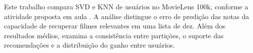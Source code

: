 Este trabalho compara SVD e KNN de usuários no MovieLens 100k, conforme a
atividade proposta em aula \cite{aula}. A análise distingue o erro de predição
das notas da capacidade de recuperar filmes relevantes em uma lista de dez.
Além dos resultados médios, examina a consistência entre partições, o suporte
das recomendações e a distribuição do ganho entre usuários.
